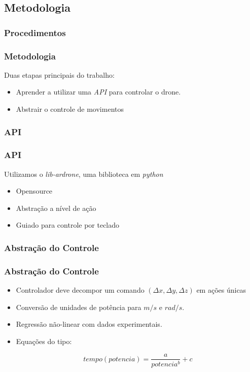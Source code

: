 \documentclass[]{beamer}
\begin{document}
\subsection{Metodologia}

\subsubsection{Procedimentos}

\begin{frame}
\frametitle{Metodologia}
Duas etapas principais do trabalho:
\begin{itemize}
\item Aprender a utilizar uma \emph{API} para controlar o drone.
\item Abstrair o controle de movimentos
\end{itemize}
\end{frame}

\subsubsection{API}

\begin{frame}
\frametitle{API}
Utilizamos o \emph{lib-ardrone}, uma biblioteca em \emph{python}
\begin{itemize}
\item Opensource
\item Abstração a nível de ação
\item Guiado para controle por teclado
\end{itemize}
\end{frame}

\subsubsection{Abstração do Controle}

\begin{frame}
\frametitle{Abstração do Controle}
\begin{itemize}
\item Controlador deve decompor um comando $(\Delta x, \Delta y, \Delta z)$ em ações únicas
\item Conversão de unidades de potência para $m/s$ e $rad/s$.
\item Regressão não-linear com dados experimentais.
\item Equações do tipo: 

\[
tempo(potencia) = \frac{a}{potencia^b} + c
\]

\end{itemize}
\end{frame}
\end{document}
